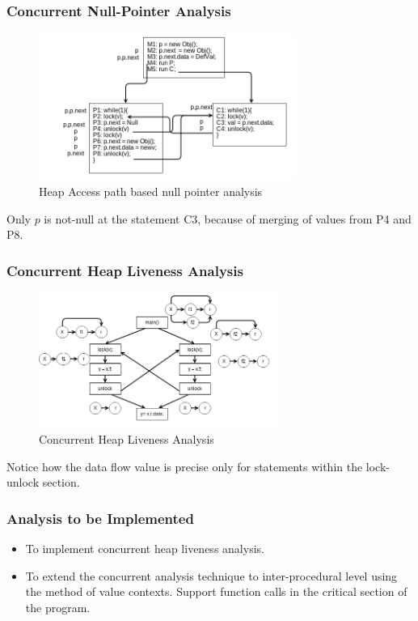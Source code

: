\documentclass{beamer}
\begin{document}
\begin{frame}
\frametitle{Concurrent Null-Pointer Analysis}
	\begin{figure}
		\centering
		\includegraphics[width=0.75\textwidth]{Figures/concurrent_analysis_2.png}
		\caption{Heap Access path based null pointer analysis}
		\label{fig:nullpointeranalysis}
	\end{figure}
	
	Only $p$ is not-null at the statement C3, because of merging of values from P4 and P8.
	
\end{frame}

\begin{frame}
	\frametitle{Concurrent Heap Liveness Analysis}
	\begin{figure}
		\centering
		\includegraphics[width=0.7\textwidth]{Figures/concurrent_analysis_3.png}
		\caption{Concurrent Heap Liveness Analysis }
		\label{fig:nullpointeranalysis}
	\end{figure}
	Notice how the data flow value is precise only for statements within the lock-unlock section.
\end{frame}
	 
	
\begin{frame}
	\frametitle{Analysis to be Implemented}
	\begin{itemize}
		\item To implement concurrent heap liveness analysis.
		\item To extend the concurrent analysis technique to inter-procedural level using the method of value contexts. Support function calls in the critical section of the program.
	\end{itemize}
	
	
\end{frame}
\end{document}
